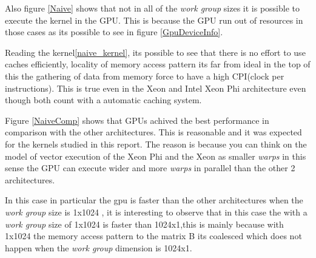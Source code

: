 \par{Also figure \ref{Naive} shows that not in all of the \emph{work group} sizes it is possible to execute the kernel in the GPU. 
This is because the GPU run out of resources in those cases\cite{opencl_error} as its possible to see in figure 
\ref{GpuDeviceInfo}.}

\par{Reading the kernel\ref{naive_kernel}, its possible to see that there is no effort to use caches efficiently, locality of
memory access pattern its far from ideal in the top of this the gathering of data from memory force to have a high CPI(clock per
instructions). This is true even in the Xeon and Intel Xeon Phi architecture even though both count with a automatic caching system.}

\par{Figure \ref{NaiveComp} shows that GPUs achived the best performance in comparison with the other architectures. This is 
    reasonable and it was expected for the kernels studied in this report. The reason is because you can think on the model of vector
    execution of the Xeon Phi and the Xeon as smaller \emph{warps} in this sense the GPU can execute wider and more \emph{warps} in
    parallel than the other 2 architectures.}
    
\par{In this case in particular the gpu is faster than the other architectures when the \emph{work group} size is 1x1024 
    , it is interesting to observe that in this case the with a \emph{work group} size of 1x1024 is faster than 1024x1,this is 
    mainly because with 1x1024 the memory access pattern to the matrix B its coalesced which does not happen when the \emph{
        work group} dimension is 1024x1.}


